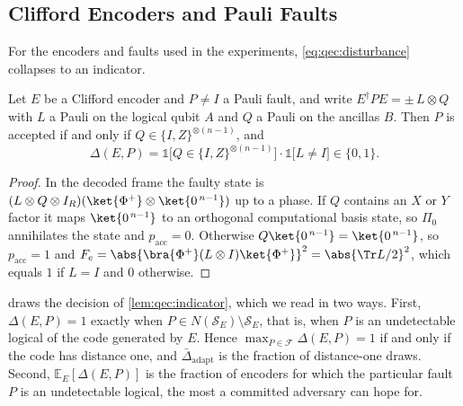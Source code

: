 \subsection{Clifford Encoders and Pauli Faults}\label{sec:qec:cliffordcase}

For the encoders and faults used in the experiments, \cref{eq:qec:disturbance} collapses to an indicator.

\begin{lemma}\label{lem:qec:indicator}
Let $E$ be a Clifford encoder and $P\neq I$ a Pauli fault, and write $E^{\dagger}PE=\pm\,L\otimes Q$ with $L$ a Pauli on the logical qubit $A$ and $Q$ a Pauli on the ancillas $B$. Then $P$ is accepted if and only if $Q\in\{I,Z\}^{\otimes(n-1)}$, and
\begin{equation}\label{eq:qec:indicator}
  \Delta(E,P)=\mathbb{1}\big[Q\in\{I,Z\}^{\otimes(n-1)}\big]\cdot\mathbb{1}\big[L\neq I\big]\in\{0,1\}.
\end{equation}
\end{lemma}
\begin{proof}
In the decoded frame the faulty state is $(L\otimes Q\otimes I_R)(\ket{\Phi^{+}}\otimes\ket{0^{\,n-1}})$ up to a phase. If $Q$ contains an $X$ or $Y$ factor it maps $\ket{0^{\,n-1}}$ to an orthogonal computational basis state, so $\Pi_0$ annihilates the state and $p_{\mathrm{acc}}=0$. Otherwise $Q\ket{0^{\,n-1}}=\ket{0^{\,n-1}}$, so $p_{\mathrm{acc}}=1$ and $F_e=\abs{\bra{\Phi^{+}}(L\otimes I)\ket{\Phi^{+}}}^{2}=\abs{\Tr L/2}^{2}$, which equals $1$ if $L=I$ and $0$ otherwise.
\end{proof}

 draws the decision of \cref{lem:qec:indicator}, which we read in two ways. First, $\Delta(E,P)=1$ exactly when $P\in N(\mathcal{S}_E)\setminus\mathcal{S}_E$, that is, when $P$ is an undetectable logical of the code generated by $E$. Hence $\max_{P\in\mathcal{F}}\Delta(E,P)=1$ if and only if the code has distance one, and $\bar\Delta_{\mathrm{adapt}}$ is the fraction of distance-one draws. Second, $\mathbb{E}_E[\Delta(E,P)]$ is the fraction of encoders for which the particular fault $P$ is an undetectable logical, the most a committed adversary can hope for.


